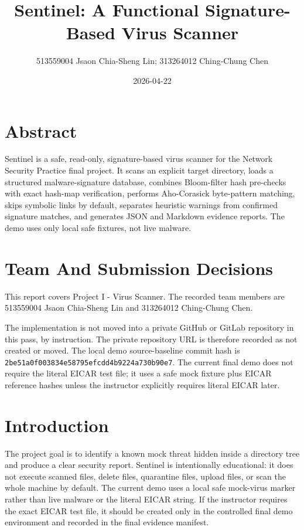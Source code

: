 \documentclass[11pt]{article}
\title{Sentinel: A Functional Signature-Based Virus Scanner}
\author{513559004 Jsaon Chia-Sheng Lin; 313264012 Ching-Chung Chen}
\date{2026-04-22}
\begin{document}
\maketitle

\section*{Abstract}

Sentinel is a safe, read-only, signature-based virus scanner for the Network
Security Practice final project. It scans an explicit target directory, loads a
structured malware-signature database, combines Bloom-filter hash pre-checks
with exact hash-map verification, performs Aho-Corasick byte-pattern matching,
skips symbolic links by default, separates heuristic warnings from confirmed
signature matches, and generates JSON and Markdown evidence reports. The demo
uses only local safe fixtures, not live malware.

\section{Team And Submission Decisions}

This report covers Project I - Virus Scanner. The recorded team members are
513559004 Jsaon Chia-Sheng Lin and 313264012 Ching-Chung Chen.

The implementation is not moved into a private GitHub or GitLab repository in
this pass, by instruction. The private repository URL is therefore recorded as
not created or moved. The local demo source-baseline commit hash is
\texttt{2be51a0f003834e58795efcdd4b9224a730b90e7}. The current final demo does
not require the literal EICAR test file; it uses a safe mock fixture plus EICAR
reference hashes unless the instructor explicitly requires literal EICAR later.

\section{Introduction}

The project goal is to identify a known mock threat hidden inside a directory
tree and produce a clear security report. Sentinel is intentionally educational:
it does not execute scanned files, delete files, quarantine files, upload files,
or scan the whole machine by default. The current demo uses a local safe
mock-virus marker rather than live malware or the literal EICAR string. If the
instructor requires the exact EICAR test file, it should be created only in the
controlled final demo environment and recorded in the final evidence manifest.
\end{document}
